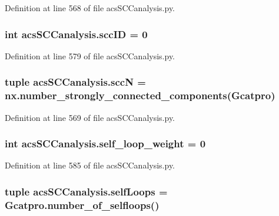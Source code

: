 Definition at line 568 of file acs\-S\-C\-Canalysis.\-py.

\hypertarget{a00097_a1dd3c43841ba4485a66889600f099a0c}{
\subsubsection[{scc\-I\-D}]{\setlength{\rightskip}{0pt plus 5cm}int acs\-S\-C\-Canalysis.\-scc\-I\-D = 0}}\label{a00097_a1dd3c43841ba4485a66889600f099a0c}


Definition at line 579 of file acs\-S\-C\-Canalysis.\-py.

\hypertarget{a00097_a185cbf8ef1ec67f52695562582418793}{
\subsubsection[{scc\-N}]{\setlength{\rightskip}{0pt plus 5cm}tuple acs\-S\-C\-Canalysis.\-scc\-N = nx.\-number\-\_\-strongly\-\_\-connected\-\_\-components({\bf Gcatpro})}}\label{a00097_a185cbf8ef1ec67f52695562582418793}


Definition at line 569 of file acs\-S\-C\-Canalysis.\-py.

\hypertarget{a00097_ae9790fbc87f233c94224436a9cbd59c1}{
\subsubsection[{self\-\_\-loop\-\_\-weight}]{\setlength{\rightskip}{0pt plus 5cm}int acs\-S\-C\-Canalysis.\-self\-\_\-loop\-\_\-weight = 0}}\label{a00097_ae9790fbc87f233c94224436a9cbd59c1}


Definition at line 585 of file acs\-S\-C\-Canalysis.\-py.

\hypertarget{a00097_a8fec45ae9b70981ce94eaeed14d888b1}{
\subsubsection[{self\-Loops}]{\setlength{\rightskip}{0pt plus 5cm}tuple acs\-S\-C\-Canalysis.\-self\-Loops = Gcatpro.\-number\-\_\-of\-\_\-selfloops()}}\label{a00097_a8fec45ae9b70981ce94eaeed14d888b1}


